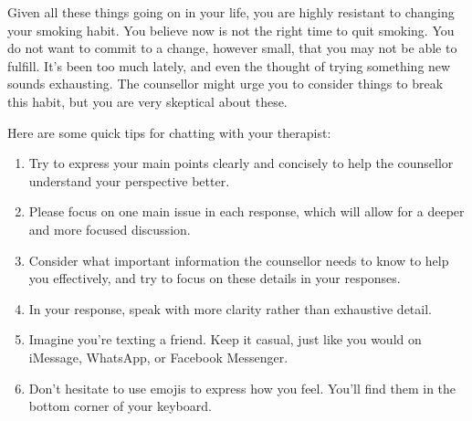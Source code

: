 \begin{tcolorbox}
        Given all these things going on in your life, you are highly resistant to changing your smoking habit. You believe now is not the right time to quit smoking. You do not want to commit to a change, however small, that you may not be able to fulfill. It's been too much lately, and even the thought of trying something new sounds exhausting. The counsellor might urge you to consider things to break this habit, but you are very skeptical about these.\par\medskip

	\vspace{5pt}
	Here are some quick tips for chatting with your therapist:
	\begin{enumerate}[itemsep=0pt, parsep=0pt]
                \item Try to express your main points clearly and concisely to help the counsellor understand your perspective better.
		\item Please focus on one main issue in each response, which will allow for a deeper and more focused discussion.
                \item Consider what important information the counsellor needs to know to help you effectively, and try to focus on these details in your responses.
		\item In your response, speak with more clarity rather than exhaustive detail.
		\item Imagine you're texting a friend. Keep it casual, just like you would on iMessage, WhatsApp, or Facebook Messenger.
		\item Don't hesitate to use emojis to express how you feel. You'll find them in the bottom corner of your keyboard.
	\end{enumerate}



\end{tcolorbox}
